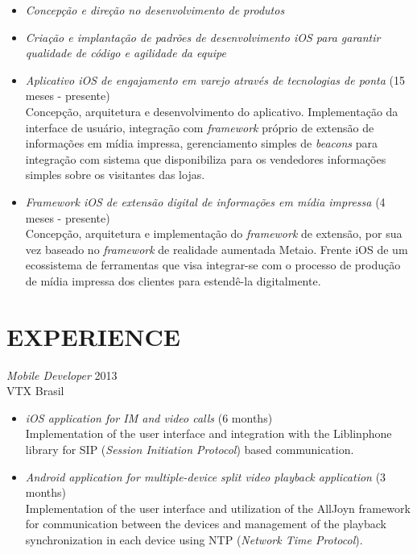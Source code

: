 \documentclass[]{res} %
\newcommand{\sbt}{\,\begin{picture}(-1,1)(-2,-3)\circle*{2}\end{picture}\ }
\def \divspace{6pt}
\def \myitemback{0.55cm}
\def \myitemsep{0pt}
\def \mypositionface{\sl}
\def \myorgface{\sc}
\begin{document}
\begin{resume}
    \begin{itemize}[itemsep=\myitemsep,leftmargin=\myitemback]
    \item[\sbt] {\it Concepção e direção no desenvolvimento de produtos}
    \item[\sbt] {\it Criação e implantação de padrões de desenvolvimento iOS para garantir qualidade de código e agilidade da equipe}
    \item[\sbt] {\it Aplicativo iOS de engajamento em varejo através de tecnologias de ponta} \hfill (15 meses - presente)\\
    Concepção, arquitetura e desenvolvimento do aplicativo. Implementação da interface de usuário, integração com {\it framework} próprio de extensão de informações em mídia impressa, gerenciamento simples de {\it beacons} para integração com sistema que disponibiliza para os vendedores informações simples sobre os visitantes das lojas.
    \item[\sbt] {\it Framework iOS de extensão digital de informações em mídia impressa} \hfill (4 meses - presente)\\
    Concepção, arquitetura e implementação do {\it framework} de extensão, por sua vez baseado no {\it framework} de realidade aumentada Metaio. Frente iOS de um ecossistema de ferramentas que visa integrar-se com o processo de produção de mídia impressa dos clientes para estendê-la digitalmente.
\end{itemize}
\else
    \section{EXPERIENCE \hspace{\divspace} }

    {\mypositionface Mobile Developer} \hfill 2013 \\
    {\myorgface VTX Brasil}

    \begin{itemize}[itemsep=\myitemsep,leftmargin=\myitemback]
    \item[\sbt] {\it iOS application for IM and video calls} \hfill (6 months)\\
    Implementation of the user interface and integration with the Liblinphone library for SIP ({\it Session Initiation Protocol}) based communication.
    \item[\sbt] {\it Android application for multiple-device split video playback application} \hfill (3 months)\\
    Implementation of the user interface and utilization of the AllJoyn framework for communication between the devices and management of the playback synchronization in each device using NTP ({\it Network Time Protocol}).
    \end{itemize}


\end{resume}
\end{document}
